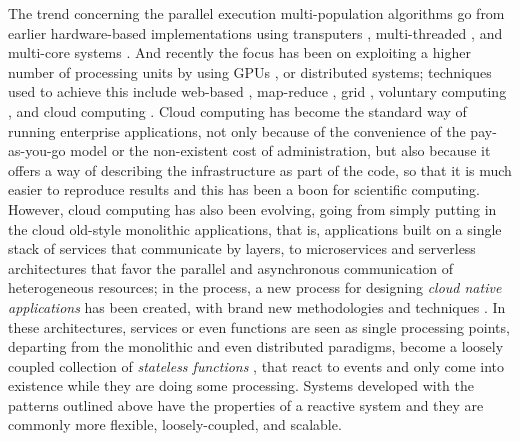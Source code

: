 \documentclass[review]{elsarticle}
\begin{document}
The trend concerning the parallel execution multi-population algorithms go from
earlier hardware-based implementations using transputers
\cite{gorges1990explicit}, multi-threaded \cite{merelo2019scaling}, and
multi-core systems \cite{Serrano2008,lai2019adaptive}. %
And recently the focus has been on exploiting a higher number of processing
units by using GPUs \cite{tan2015survey,li2007efficient}, or distributed
systems; techniques used to achieve this include web-based \cite{JSON},
map-reduce \cite{fazenda2012},  grid \cite{munawar2010design,Gonzalez09},
voluntary computing \cite{MilkyWay}, and cloud computing
\cite{GValdez2015,salza2019speed,valenzuela2015implementing,FlexGP}. %
Cloud computing has become the standard way of running
enterprise applications, not only because of the convenience of the
pay-as-you-go model or the non-existent cost of administration, but also because
it offers a way of describing the infrastructure as part of the code, so that it
is much easier to reproduce results and this has been a boon for scientific
computing.  However,  cloud computing has also been evolving, going from simply
putting in the cloud old-style monolithic applications, that is, applications
built on a single stack of services that communicate by layers, to microservices
\cite{microservices} and serverless architectures \cite{varghese2018next,
Varghese2018849} that favor the parallel and asynchronous communication of
heterogeneous resources; in the process, a new process for designing {\em cloud
native applications} has been created, with brand new methodologies and
techniques \cite{Baldini2016287}. In these architectures, services or even
functions are seen as single processing points, departing from the monolithic
and even distributed paradigms, become a loosely coupled collection of {\em
stateless functions} \cite{malawski2017serverless}, that react to events and
only come into existence while they are doing some processing. %
Systems developed with the patterns outlined above have the
properties of a reactive system \cite{boner2014reactive} and they are commonly
more flexible, loosely-coupled, and scalable. %



\end{document}
